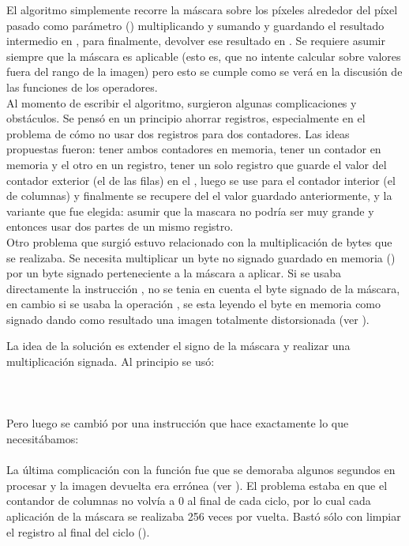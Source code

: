 El algoritmo simplemente recorre la m\'ascara sobre los p\'ixeles alrededor del p\'ixel pasado como par\'ametro 
() multiplicando y sumando y guardando el resultado intermedio en , para finalmente, devolver 
ese resultado en . Se requiere asumir siempre que la m\'ascara es aplicable (esto es, que no intente 
calcular sobre valores fuera del rango de la imagen) pero esto se cumple como se ver\'a en la discusi\'on de las 
funciones de los operadores. \\

Al momento de escribir el algoritmo, surgieron algunas complicaciones y obst\'aculos. Se pens\'o en un principio 
ahorrar registros, especialmente en el problema de c\'omo no usar dos registros para dos contadores. Las ideas 
propuestas fueron: tener ambos contadores en memoria, tener un contador en memoria y el otro en un registro, 
tener un solo registro que guarde el valor del contador exterior (el de las filas) en el , luego se use 
para el contador interior (el de columnas) y finalmente se recupere del  el valor guardado 
anteriormente, y la variante que fue elegida: asumir que la mascara no podr\'ia ser muy grande y entonces usar 
dos partes de un mismo registro.\\

Otro problema que surgi\'o estuvo relacionado con la multiplicaci\'on de bytes que se realizaba. Se necesita 
multiplicar un byte no signado guardado en memoria (\code{[esi]}) por un byte signado perteneciente a la m\'ascara 
a aplicar. Si se usaba directamente la instrucci\'on , no se tenia en cuenta el byte signado de la m\'ascara, 
en cambio si se usaba la operaci\'on , se esta leyendo el byte en memoria como signado dando como resultado
una imagen totalmente distorsionada (ver ).

La idea de la soluci\'on es extender el signo de la m\'ascara y realizar una multiplicaci\'on signada. Al principio 
se us\'o: \\
\indent{}\\
\indent{}\\
\indent{} \\
Pero luego se cambi\'o por una instrucci\'on que hace exactamente lo que necesit\'abamos:\\
\indent{}\\
La \'ultima complicaci\'on con la funci\'on fue que se demoraba algunos segundos en procesar y la imagen devuelta era
err\'onea (ver ). El problema estaba en que el contandor de columnas no volv\'ia a 0 al final de cada ciclo, por lo cual cada 
aplicaci\'on de la m\'ascara se realizaba 256 veces por vuelta. Bast\'o s\'olo con limpiar el registro al final del
ciclo ().


